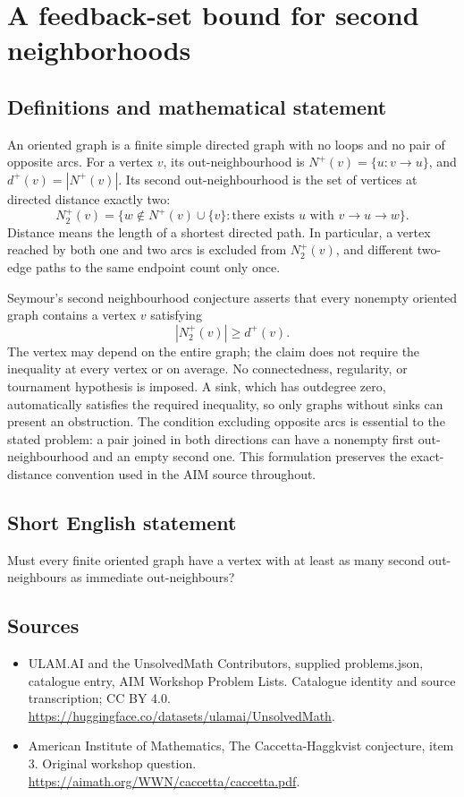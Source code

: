 \documentclass[11pt,a4paper]{article}
\begin{document}
\section*{A feedback-set bound for second neighborhoods}\label{statement}

\subsection{Definitions and mathematical statement}
An oriented graph is a finite simple directed graph with no loops and
no pair of opposite arcs. For a vertex $v$, its out-neighbourhood is
$N^+(v)=\{u:v\to u\}$, and $d^+(v)=|N^+(v)|$.
Its second out-neighbourhood is the set of vertices at directed distance
exactly two:
\[
 N_2^+(v)=\{w\notin N^+(v)\cup\{v\}:\text{there exists }u
                                   \text{ with }v\to u\to w\}.
\]
Distance means the length of a shortest directed path. In particular,
a vertex reached by both one and two arcs is excluded from $N_2^+(v)$,
and different two-edge paths to the same endpoint count only once.

Seymour's second neighbourhood conjecture asserts that every nonempty
oriented graph contains a vertex $v$ satisfying
\[
                            |N_2^+(v)|\ge d^+(v).
\]
The vertex may depend on the entire graph; the claim does not require
the inequality at every vertex or on average. No connectedness,
regularity, or tournament hypothesis is imposed. A sink, which has
outdegree zero, automatically satisfies the required inequality, so
only graphs without sinks can present an obstruction.
The condition excluding opposite arcs is essential to the stated
problem: a pair joined in both directions can have a nonempty first
out-neighbourhood and an empty second one. This formulation preserves
the exact-distance convention used in the AIM source throughout.
\subsection{Short English statement}
Must every finite oriented graph have a vertex with at least as many second out-neighbours as immediate out-neighbours?
\subsection{Sources}
\begin{itemize}
\item[S1] ULAM.AI and the UnsolvedMath Contributors, supplied problems.json, catalogue entry, AIM Workshop Problem Lists. Catalogue identity and source transcription; CC BY 4.0.
\url{https://huggingface.co/datasets/ulamai/UnsolvedMath}.
\item[S2] American Institute of Mathematics, The Caccetta-Haggkvist conjecture, item 3. Original workshop question.
\url{https://aimath.org/WWN/caccetta/caccetta.pdf}.
\end{itemize}
\end{document}
